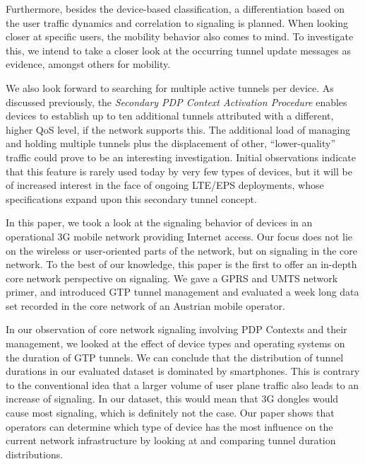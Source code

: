 Furthermore, besides the device-based classification, a differentiation based on the user traffic dynamics and correlation to signaling is planned. When looking closer at specific users, the mobility behavior also comes to mind. To investigate this, we intend to take a closer look at the occurring tunnel update messages as evidence, amongst others for mobility.

We also look forward to searching for multiple active tunnels per device. As discussed previously, the \textit{Secondary PDP Context Activation Procedure} enables devices to establish up to ten additional tunnels attributed with a different, higher QoS level, if the network supports this. The additional load of managing and holding multiple tunnels plus the displacement of other, ``lower-quality'' traffic could prove to be an interesting investigation. Initial observations indicate that this feature is rarely used today by very few types of devices, but it will be of increased interest in the face of ongoing LTE/EPS deployments, whose specifications expand upon this secondary tunnel concept.




In this paper, we took a look at the signaling behavior of devices in an operational \gls{3G} mobile network providing Internet access. Our focus does not lie on the wireless or user-oriented parts of the network, but on signaling in the core network. To the best of our knowledge, this paper is the first to offer an in-depth core network perspective on signaling. We gave a \gls{GPRS} and \gls{UMTS} network primer, and introduced \gls{GTP} tunnel management and evaluated a week long data set recorded in the core network of an Austrian mobile operator.

In our observation of core network signaling involving \gls{PDP} Contexts and their management, we looked at the effect of device types and operating systems on the duration of \gls{GTP} tunnels. We can conclude that the distribution of tunnel durations in our evaluated dataset is dominated by smartphones. This is contrary to the conventional idea that a larger volume of user plane traffic also leads to an increase of signaling. In our dataset, this would mean that 3G dongles would cause most signaling, which is definitely not the case. Our paper shows that operators can determine which type of device has the most influence on the current network infrastructure by looking at and comparing tunnel duration distributions.

